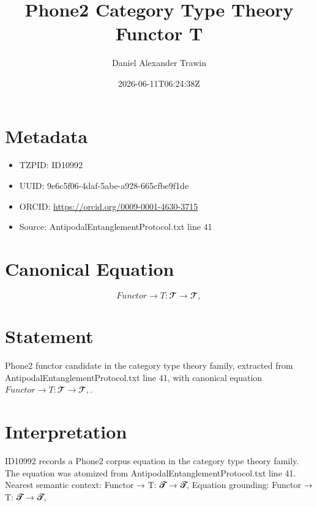 \documentclass[11pt]{article}
\title{Phone2 Category Type Theory Functor T}
\author{Daniel Alexander Trawin}
\date{2026-06-11T06:24:38Z}
\begin{document}
\maketitle
\section*{Metadata}
\begin{itemize}
\item TZPID: ID10992
\item UUID: 9e6c5f06-4daf-5abe-a928-665cfbe9f1de
\item ORCID: \url{https://orcid.org/0009-0001-4630-3715}
\item Source: AntipodalEntanglementProtocol.txt line 41
\end{itemize}
\section*{Canonical Equation}
\[
Functor → T: 𝓣 → 𝓣,
\]
\section*{Statement}
Phone2 functor candidate in the category type theory family, extracted from AntipodalEntanglementProtocol.txt line 41, with canonical equation $Functor → T: 𝓣 → 𝓣,$.
\section*{Interpretation}
ID10992 records a Phone2 corpus equation in the category type theory family. The equation was atomized from AntipodalEntanglementProtocol.txt line 41. Nearest semantic context: Functor → T: 𝓣 → 𝓣, Equation grounding: Functor → T: 𝓣 → 𝓣,
\end{document}
